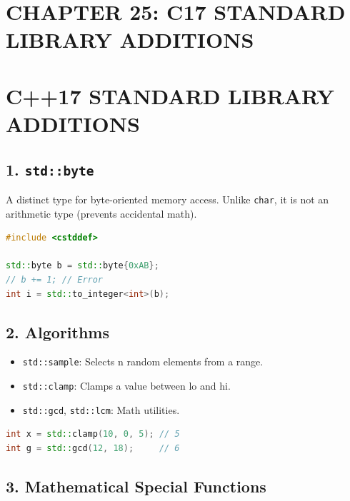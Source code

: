 \hypertarget{chapter-25-c17-standard-library-additions}{%
\section{CHAPTER 25: C17 STANDARD LIBRARY
ADDITIONS}\label{chapter-25-c17-standard-library-additions}}

\hypertarget{c17-standard-library-additions}{%
\section{C++17 STANDARD LIBRARY
ADDITIONS}\label{c17-standard-library-additions}}

\hypertarget{stdbyte}{%
\subsection{\texorpdfstring{1.
\texttt{std::byte}}{1. std::byte}}\label{stdbyte}}

A distinct type for byte-oriented memory access. Unlike
\passthrough{\lstinline!char!}, it is not an arithmetic type (prevents
accidental math).

\begin{lstlisting}[language={C++}]
#include <cstddef>

std::byte b = std::byte{0xAB};
// b += 1; // Error
int i = std::to_integer<int>(b);
\end{lstlisting}

\hypertarget{algorithms}{%
\subsection{2. Algorithms}\label{algorithms}}

\begin{itemize}
\tightlist
\item
  \passthrough{\lstinline!std::sample!}: Selects n random elements from
  a range.
\item
  \passthrough{\lstinline!std::clamp!}: Clamps a value between lo and
  hi.
\item
  \passthrough{\lstinline!std::gcd!},
  \passthrough{\lstinline!std::lcm!}: Math utilities.
\end{itemize}

\begin{lstlisting}[language={C++}]
int x = std::clamp(10, 0, 5); // 5
int g = std::gcd(12, 18);     // 6
\end{lstlisting}

\hypertarget{mathematical-special-functions}{%
\subsection{3. Mathematical Special
Functions}\label{mathematical-special-functions}}

